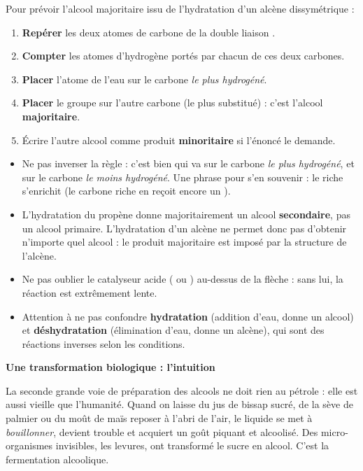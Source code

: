 \documentclass[11pt]{article}
\newcommand{\cle}[1]{{\popxbold\color{popdark}#1}}
\newcounter{popsec}
\newcounter{popsub}
\newcommand{\courssub}[1]{%
  \stepcounter{popsub}%
  \par\vspace{9pt}\noindent{\popxbold\fontsize{11.5}{13}\selectfont\color{popink}{\color{poporange}\thepopsec.\thepopsub}\hspace{6pt}#1}\par\nopagebreak\vspace{4pt}
}
\begin{document}
\begin{methode}
Pour prévoir l'alcool majoritaire issu de l'hydratation d'un alcène dissymétrique :
\begin{enumerate}
\item \textbf{Repérer} les deux atomes de carbone de la double liaison .
\item \textbf{Compter} les atomes d'hydrogène portés par chacun de ces deux carbones.
\item \textbf{Placer} l'atome  de l'eau sur le carbone \emph{le plus hydrogéné}.
\item \textbf{Placer} le groupe  sur l'autre carbone (le plus substitué) : c'est l'alcool \textbf{majoritaire}.
\item Écrire l'autre alcool comme produit \textbf{minoritaire} si l'énoncé le demande.
\end{enumerate}
\end{methode}

\begin{attention}
\begin{itemize}
\item Ne pas inverser la règle : c'est bien  qui va sur le carbone \emph{le plus hydrogéné}, et  sur le carbone \emph{le moins hydrogéné}. Une phrase pour s'en souvenir : \og le riche s'enrichit \fg{} (le carbone riche en  reçoit encore un ).
\item L'hydratation du propène donne majoritairement un alcool \textbf{secondaire}, pas un alcool primaire. L'hydratation d'un alcène ne permet donc pas d'obtenir n'importe quel alcool : le produit majoritaire est imposé par la structure de l'alcène.
\item Ne pas oublier le catalyseur acide ( ou ) au-dessus de la flèche : sans lui, la réaction est extrêmement lente.
\item Attention à ne pas confondre \textbf{hydratation} (addition d'eau, donne un alcool) et \textbf{déshydratation} (élimination d'eau, donne un alcène), qui sont des réactions inverses selon les conditions.
\end{itemize}
\end{attention}

\courssub{Fermentation alcoolique}

\textbf{Une transformation biologique : l'intuition}\par

La seconde grande voie de préparation des alcools ne doit rien au pétrole : elle est aussi vieille que l'humanité. Quand on laisse du jus de bissap sucré, de la sève de palmier ou du moût de maïs reposer à l'abri de l'air, le liquide se met à \emph{bouillonner}, devient trouble et acquiert un goût piquant et alcoolisé. Des micro-organismes invisibles, les \cle{levures}, ont transformé le sucre en alcool. C'est la \cle{fermentation alcoolique}.
\end{document}

